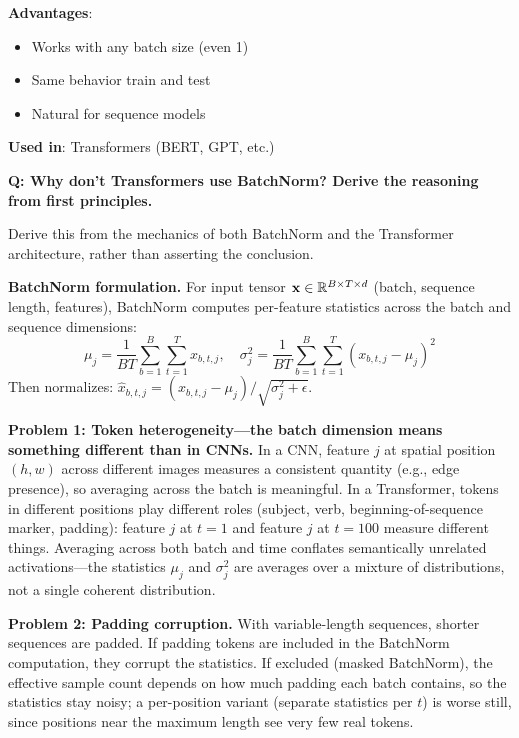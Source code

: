 \textbf{Advantages}:
\begin{itemize}
    \item Works with any batch size (even 1)
    \item Same behavior train and test
    \item Natural for sequence models
\end{itemize}

\textbf{Used in}: Transformers (BERT, GPT, etc.)


\begin{interviewq}
\textbf{Q: Why don't Transformers use BatchNorm? Derive the reasoning from first principles.}

 \quad {} \quad \badgefreq{\freqmed}

\stronganswer

Derive this from the mechanics of both BatchNorm and the Transformer architecture, rather than asserting the conclusion.

\textbf{BatchNorm formulation.} For input tensor $\mathbf{x} \in \mathbb{R}^{B \times T \times d}$ (batch, sequence length, features), BatchNorm computes per-feature statistics across the batch and sequence dimensions:
\begin{equation*}
\mu_j = \frac{1}{BT}\sum_{b=1}^B\sum_{t=1}^T x_{b,t,j}, \quad \sigma_j^2 = \frac{1}{BT}\sum_{b=1}^B\sum_{t=1}^T (x_{b,t,j} - \mu_j)^2
\end{equation*}
Then normalizes: $\hat{x}_{b,t,j} = (x_{b,t,j} - \mu_j)/\sqrt{\sigma_j^2 + \epsilon}$.

\textbf{Problem 1: Token heterogeneity---the batch dimension means something different than in CNNs.} In a CNN, feature $j$ at spatial position $(h,w)$ across different images measures a consistent quantity (e.g., edge presence), so averaging across the batch is meaningful. In a Transformer, tokens in different positions play different roles (subject, verb, beginning-of-sequence marker, padding): feature $j$ at $t=1$ and feature $j$ at $t=100$ measure different things. Averaging across both batch and time conflates semantically unrelated activations---the statistics $\mu_j$ and $\sigma_j^2$ are averages over a mixture of distributions, not a single coherent distribution.

\textbf{Problem 2: Padding corruption.} With variable-length sequences, shorter sequences are padded. If padding tokens are included in the BatchNorm computation, they corrupt the statistics. If excluded (masked BatchNorm), the effective sample count depends on how much padding each batch contains, so the statistics stay noisy; a per-position variant (separate statistics per $t$) is worse still, since positions near the maximum length see very few real tokens.


\end{interviewq}
